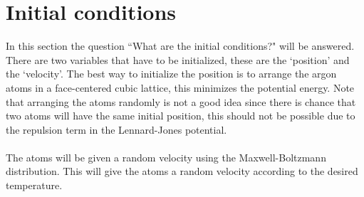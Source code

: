 \documentclass[12pt,a4paper]{report}
\begin{document}
\section{Initial conditions}
In this section the question ``What are the initial conditions?" will be answered.\\
There are two variables that have to be initialized, these are the `position' and the `velocity'. The best way to initialize the position is to arrange the argon atoms in a face-centered cubic lattice, this minimizes the potential energy. Note that arranging the atoms randomly is not a good idea since there is chance that two atoms will have the same initial position, this should not be possible due to the repulsion term in the Lennard-Jones potential.\\ \\ The atoms will be given a random velocity using the Maxwell-Boltzmann distribution. This will give the atoms a random velocity according to the desired temperature.
\end{document}
